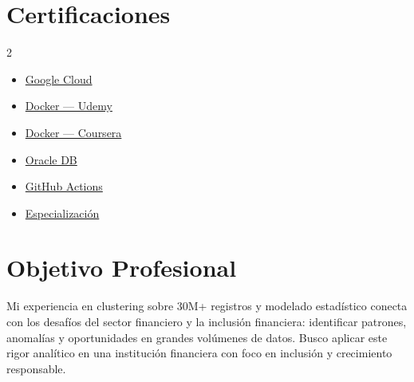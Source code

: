 \documentclass[9.5pt, letterpaper]{article}
\begin{document}
\vspace{-2pt}
\begin{minipage}[t]{0.46\textwidth}
\section{Certificaciones}
{\footnotesize
\begin{multicols}{2}
\begin{itemize}[leftmargin=1.1em, itemsep=0pt, topsep=0pt, parsep=0pt]
  \item \href{https://dvillagrans.dev/about#google-cloud}{Google Cloud \color{accent}\faExternalLink*}
  \item \href{https://dvillagrans.dev/about#udemy-docker}{Docker --- Udemy \color{accent}\faExternalLink*}
  \item \href{https://dvillagrans.dev/about#coursera-docker}{Docker --- Coursera \color{accent}\faExternalLink*}
  \item \href{https://dvillagrans.dev/about#oracle-db}{Oracle DB \color{accent}\faExternalLink*}
  \item \href{https://dvillagrans.dev/about#github-actions}{GitHub Actions \color{accent}\faExternalLink*}
  \item \href{https://dvillagrans.dev/about#aws-deeplearning}{Especializaci\'on \color{accent}\faExternalLink*}
\end{itemize}
\end{multicols}
}
\end{minipage}
\hfill
\begin{minipage}[t]{0.50\textwidth}
\section{Objetivo Profesional}
{\small\color{textdark}
Mi experiencia en clustering sobre 30M+ registros y modelado estad\'istico
conecta con los desaf\'ios del sector financiero y la inclusi\'on financiera:
identificar patrones, anomal\'ias y oportunidades en grandes vol\'umenes
de datos. Busco aplicar este rigor anal\'itico en una instituci\'on financiera con foco en inclusi\'on y crecimiento responsable.
}
\end{minipage}
\end{document}
